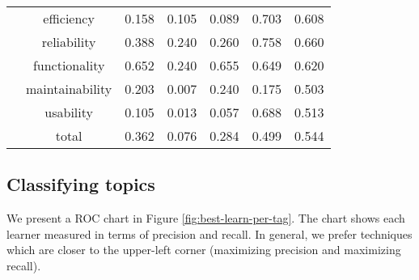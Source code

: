 \documentclass{acm_proc_article-sp}
\begin{document}
\begin{table*}[h]
\begin{tabular}{c|c|c|c|c|c|c}
 & efficiency & 0.158 & 0.105 & 0.089 & 0.703 & 0.608 \\ 
 & reliability & 0.388 & 0.240 & 0.260 & 0.758 & 0.660 \\ 
 & functionality & 0.652 & 0.240 & 0.655 & 0.649 & 0.620 \\ 
 & maintainability & 0.203 & 0.007 & 0.240 & 0.175 & 0.503 \\ 
 & usability & 0.105 & 0.013 & 0.057 & 0.688 & 0.513 \\ 
 & total & 0.362 & 0.076 & 0.284 & 0.499 & 0.544 \\
\bottomrule
\end{tabular}
\end{table*}

\subsection{Classifying topics}



We present a ROC chart in Figure \ref{fig:best-learn-per-tag}. The chart shows each learner measured in terms of precision and recall. In general, we prefer techniques which are closer to the upper-left corner (maximizing precision and maximizing recall). 
\end{document}
